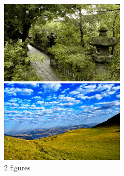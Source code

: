 \begin{figure}[H]
\begin{minipage}{0.5\hsize}
    \centering
    \includegraphics[width=6cm]{./sample/1.png}
\end{minipage}
\begin{minipage}{0.5\hsize}
    \centering
    \includegraphics[width=6cm]{./sample/2.png}
\end{minipage}
\caption{2 figures \label{fig:2fig}}
\end{figure}
